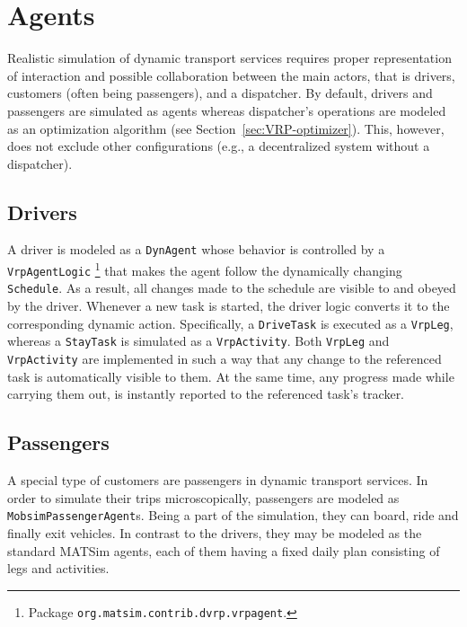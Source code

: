 
\section{Agents}

Realistic simulation of dynamic transport services requires proper representation of interaction and possible collaboration between the main actors, that is drivers, customers (often being passengers), and a dispatcher. By default, drivers and passengers are simulated as agents whereas dispatcher's operations are modeled as an optimization algorithm (see Section~\ref{sec:VRP-optimizer}). This, however, does not exclude other configurations (e.g., a decentralized system without a dispatcher).

\subsection{Drivers}
\label{sec:VRP-agent}

A driver is modeled as a \lstinline$DynAgent$ whose behavior is controlled by a \lstinline$VrpAgentLogic$%
\footnote{
Package \lstinline$org.matsim.contrib.dvrp.vrpagent$.
}
that makes the agent follow the dynamically changing \lstinline$Schedule$. As a result, all changes made to the schedule are visible to and obeyed by the driver. Whenever a new task is started, the driver logic converts it to the corresponding dynamic action. Specifically, a \lstinline$DriveTask$ is executed as a \lstinline$VrpLeg$, whereas a \lstinline$StayTask$ is simulated as a \lstinline$VrpActivity$. Both \lstinline$VrpLeg$ and \lstinline$VrpActivity$ are implemented in such a way that any change to the referenced task is automatically visible to them. At the same time, any progress made while carrying them out, is instantly reported to the referenced task's tracker.

\subsection{Passengers}
\label{sec:VRP-passengers}

A special type of customers are passengers in dynamic transport services. In order to simulate their trips microscopically, passengers are modeled as \lstinline$MobsimPassengerAgent$s. Being a part of the simulation, they can board, ride and finally exit vehicles. In contrast to the drivers, they may be modeled as the standard MATSim agents, each of them having a fixed daily plan consisting of legs and activities.

